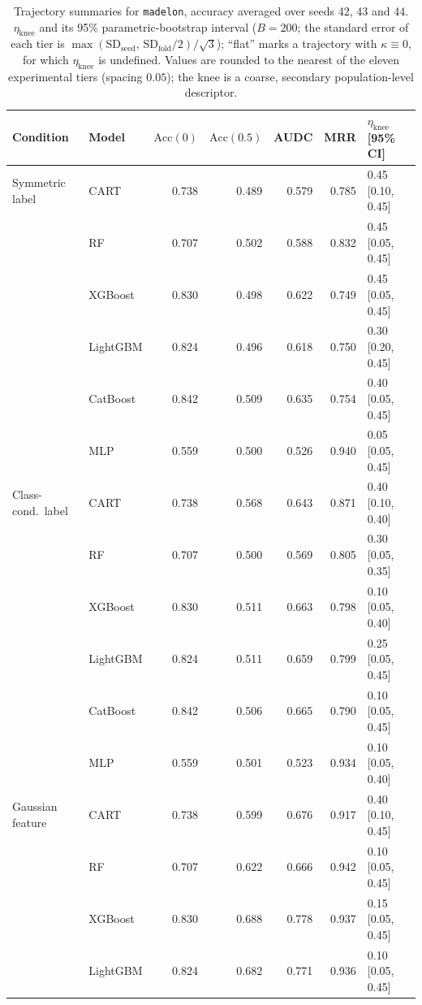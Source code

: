\begin{table}[p]
\centering
\scriptsize
\setlength{\tabcolsep}{3.5pt}
\caption{Trajectory summaries for \texttt{madelon}, accuracy averaged over seeds 42, 43 and 44. $\eta_{\mathrm{knee}}$ and its 95\% parametric-bootstrap interval ($B=200$; the standard error of each tier is $\max(\mathrm{SD}_{\mathrm{seed}},\,\mathrm{SD}_{\mathrm{fold}}/2)/\sqrt3$); ``flat'' marks a trajectory with $\kappa\equiv 0$, for which $\eta_{\mathrm{knee}}$ is undefined. Values are rounded to the nearest of the eleven experimental tiers (spacing $0.05$); the knee is a coarse, secondary population-level descriptor.}
\label{tab:traj_madelon}
\begin{tabular}{@{}llrrrrl@{}}
\toprule
Condition & Model & $\mathrm{Acc}(0)$ & $\mathrm{Acc}(0.5)$ & AUDC & MRR & $\eta_{\mathrm{knee}}$ [95\% CI] \\
\midrule
Symmetric label & CART & 0.738 & 0.489 & 0.579 & 0.785 & 0.45 [0.10, 0.45] \\
 & RF & 0.707 & 0.502 & 0.588 & 0.832 & 0.45 [0.05, 0.45] \\
 & XGBoost & 0.830 & 0.498 & 0.622 & 0.749 & 0.45 [0.05, 0.45] \\
 & LightGBM & 0.824 & 0.496 & 0.618 & 0.750 & 0.30 [0.20, 0.45] \\
 & CatBoost & 0.842 & 0.509 & 0.635 & 0.754 & 0.40 [0.05, 0.45] \\
 & MLP & 0.559 & 0.500 & 0.526 & 0.940 & 0.05 [0.05, 0.45] \\
\midrule
Class-cond.\ label & CART & 0.738 & 0.568 & 0.643 & 0.871 & 0.40 [0.10, 0.40] \\
 & RF & 0.707 & 0.500 & 0.569 & 0.805 & 0.30 [0.05, 0.35] \\
 & XGBoost & 0.830 & 0.511 & 0.663 & 0.798 & 0.10 [0.05, 0.40] \\
 & LightGBM & 0.824 & 0.511 & 0.659 & 0.799 & 0.25 [0.05, 0.45] \\
 & CatBoost & 0.842 & 0.506 & 0.665 & 0.790 & 0.10 [0.05, 0.45] \\
 & MLP & 0.559 & 0.501 & 0.523 & 0.934 & 0.10 [0.05, 0.40] \\
\midrule
Gaussian feature & CART & 0.738 & 0.599 & 0.676 & 0.917 & 0.40 [0.10, 0.45] \\
 & RF & 0.707 & 0.622 & 0.666 & 0.942 & 0.10 [0.05, 0.45] \\
 & XGBoost & 0.830 & 0.688 & 0.778 & 0.937 & 0.15 [0.05, 0.45] \\
 & LightGBM & 0.824 & 0.682 & 0.771 & 0.936 & 0.10 [0.05, 0.45] \\

\end{tabular}
\end{table}
